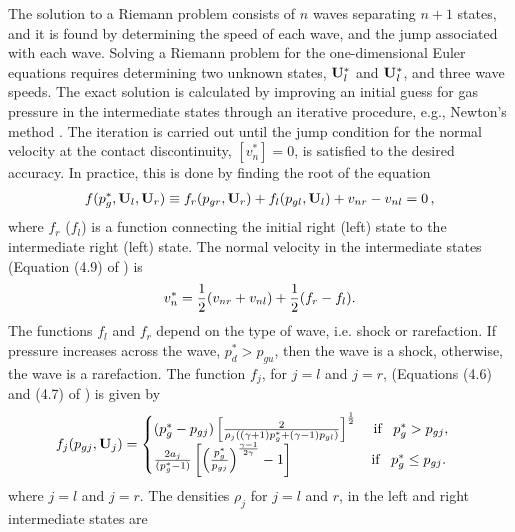 The solution to a Riemann problem consists of $n$ waves separating $n+1$ states, and it is found by determining the speed of each wave, and the jump associated with each wave.  Solving a Riemann problem for the one-dimensional Euler equations requires determining two unknown states, $\mathbf{U}^*_l$ and $\mathbf{U}^*_l$, and three wave speeds.  The exact solution is calculated by improving an initial guess for gas pressure in the intermediate states through an iterative procedure, e.g., Newton's method \citep{Toro:1999}.  The iteration is carried out until the jump condition for the normal velocity at the contact discontinuity, $[v^*_n] = 0$, is satisfied to the desired accuracy.  In practice, this is done by finding the root of the equation
\begin{gather*}
f(p^*_g,\mathbf{U}_l,\mathbf{U}_r) \equiv f_r(p_{gr},\mathbf{U}_r) + f_l(p_{gl},\mathbf{U}_l) + v_{nr} - v_{nl} = 0 \, ,
\end{gather*}
where $f_r$ ($f_l$) is a function connecting the initial right (left) state to the intermediate right (left) state.  The normal velocity in the intermediate states (Equation (4.9) of \citep{Toro:1999}) is 
\begin{gather*}
v^*_n = \frac{1}{2} (v_{nr} + v_{nl}) + \frac{1}{2} (f_r - f_l).
\end{gather*}
The functions $f_l$ and $f_r$ depend on the type of wave, i.e. shock or rarefaction.  If pressure increases across the wave, $p^*_d > p_{gu}$, then the wave is a shock, otherwise, the wave is a rarefaction.  The function $f_j$, for $j=l$ and $j=r$, (Equations (4.6) and (4.7) of \citep{Toro:1999}) is given by
\begin{gather*}
f_j(p_{gj},\mathbf{U}_j) = 
\begin{cases}
(p^*_g - p_{gj})\left[ \frac{2}{\rho_j((\gamma +1)p^*_{g} + (\gamma -1)p_{gl})} \right]^{\frac{1}{2}} 
  \;\;\;\; \text{if}\;\;\; p^*_g > p_{gj}, \\
\frac{2a_j}{(p^*_g - 1)}\left[\left(\frac{p^*_g}{p_{gj}} \right)^{\frac{\gamma-1}{2\gamma}} - 1\right] 
  \;\;\;\;\;\;\;\;\;\;\;\;\;\;\;\;\;\;\;\; \text{if}\;\;\; p^*_g \le p_{gj}. \\
\end{cases}
\end{gather*}
where $j=l$ and $j=r$.  The densities $\rho_j$ for $j=l$ and $r$, in the left and right intermediate states are
